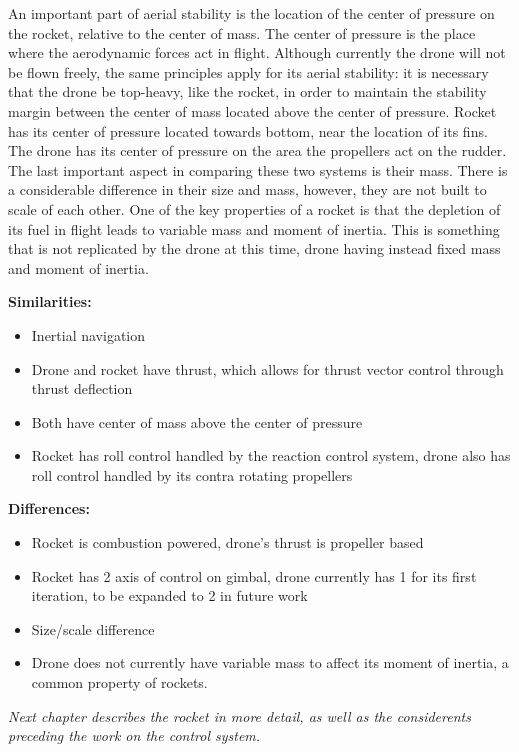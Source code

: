 An important part of aerial stability is the location of the center of pressure on the rocket, relative to the center of mass. The center of pressure is the place where the aerodynamic forces act in flight. 
Although currently the drone will not be flown freely, the same principles apply for its aerial stability: it is necessary that the drone be top-heavy, like the rocket, in order to maintain the stability margin between the center of mass located above the center of pressure. 
Rocket has its center of pressure located towards bottom, near the location of its fins. The drone has its center of pressure on the area the propellers act on the rudder. The last important aspect in comparing these two systems is their mass. There is a considerable difference in their size and mass, however, they are not built to scale of each other. One of the key properties of a rocket is that the depletion of its fuel in flight leads to variable mass and moment of inertia. This is something that is not replicated by the drone at this time, drone having instead fixed mass and moment of inertia. 

\vspace{5mm}

\textbf{Similarities:}
\begin{itemize}
\item Inertial navigation
\item Drone and rocket have thrust, which allows for thrust vector control through thrust deflection 
\item Both have center of mass above the center of pressure 
\item Rocket has roll control handled by the reaction control system, drone also has roll control handled by its contra rotating propellers 
\end{itemize}


\textbf{Differences:}
\begin{itemize}
\item Rocket is combustion powered, drone’s thrust is propeller based
\item Rocket has 2 axis of control on gimbal, drone currently has 1 for its first iteration, to be expanded to 2 in future work
\item Size/scale difference 
\item Drone does not currently have variable mass to affect its moment of inertia, a common property of rockets.
\end{itemize}


\textit{Next chapter describes the rocket in more detail, as well as the considerents preceding the work on the control system. }

